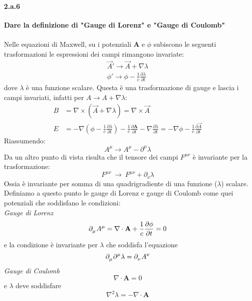 \documentclass[twoside]{article}
\begin{document}
\paragraph{2.a.6}\textbf{Dare la definizione di "Gauge di Lorenz" e "Gauge di Coulomb"}\\
\\
Nelle equazioni di Maxwell, su i potenziali $\mathbf{A}$ e $\phi$ subiscono le seguenti trasformazioni le espressioni dei campi rimangono invariate:
\begin{align}
    \vec{A}'\longrightarrow\vec{A}+\nabla\lambda\\
    \phi'\longrightarrow\phi-\frac{1}{c}\frac{\partial\lambda}{\partial t}
\end{align}
dove $\lambda$ è una funzione scalare. Questa è una trasformazione di gauge e lascia i campi invariati, infatti per $A\longrightarrow A+\nabla\lambda$:
\begin{align*}
    B&=\nabla\times (\vec{A}+\nabla\lambda)=\nabla\times \vec{A}\\
    E&=-\nabla\left(\phi-\frac{1}{c}\frac{\partial\lambda}{\partial t}\right)-\frac{1}{c}\frac{\partial \mathbf{A}}{\partial t}-\nabla\frac{\partial\lambda}{\partial t}=-\nabla\phi-\frac{1}{c}\frac{\partial \vec{A}}{\partial t}
\end{align*}
Riassumendo:
\begin{equation}
    A^\mu\to A^\mu-\partial^\mu \lambda
\end{equation}
Da un altro punto di vista risulta che il tensore dei campi $F^{\mu\nu}$ è invariante per la trasformazione:
\begin{equation}
    F^{\mu\nu} \ \to \ F^{\mu \nu}+\partial_\nu \lambda
\end{equation} Ossia è invariante per somma di una quadrigradiente di una funzione ($\lambda$) scalare.
\\
Definiamo a questo punto le gauge di Lorenz e gauge di Coulomb come quei potenziali che soddisfano le condizioni:
\\
\textit{Gauge di Lorenz}\\
\begin{equation*}
    \tensor{\partial}{_{\mu}}\tensor{A}{^{\mu}}=\nabla\cdot\mathbf{A}+\frac{1}{c}\frac{\partial\phi}{\partial t}=0
\end{equation*}
e la condizione è invariante per $\lambda$ che soddisfa l'equazione
\begin{equation*}
    \tensor{\partial}{_{\mu}}\tensor{\partial}{^{\mu}}\lambda=\tensor{\partial}{_{\nu}}\tensor{A}{^{\nu}}
\end{equation*}
\textit{Gauge di Coulomb}\\
\begin{equation*}
    \nabla\cdot\mathbf{A}=0
\end{equation*}
e $\lambda$ deve soddisfare 
\begin{equation*}
    \nabla^2\lambda=-\nabla\cdot\mathbf{A}
\end{equation*}
\end{document}
